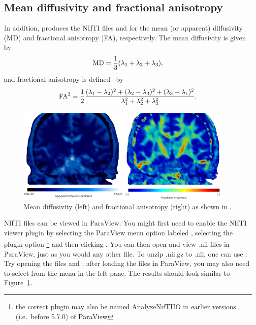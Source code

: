 \subsection{Mean diffusivity and fractional anisotropy}
In addition,  produces the NIfTI files
 and  for the mean (or apparent)
diffusivity (MD) and fractional anisotropy (FA), respectively. 
The mean diffusivity is given by 
\begin{equation}\label{eqn:chp5:md}
  \rm{MD} = \frac{1}{3}(\lambda_1 + \lambda_2 + \lambda_3),   
\end{equation}
and  fractional
anisotropy is defined~\cite{kindlmann2007geodesic} by
\begin{equation}\label{eqn:chp5:fa}
	\rm{FA}^2 = \frac{1}{2} \frac{(\lambda_1-\lambda_2)^2 
+ (\lambda_2 - \lambda_3)^2 + (\lambda_3 - \lambda_1)^2}{\lambda_1^2 
+ \lambda_2^2 + \lambda_3^2} .  
\end{equation}
\begin{figure}	
  \begin{center}
    \includegraphics[width=0.95\textwidth]{./graphics/chp5/paraview_adcfa.png}
  \end{center}
  \caption{Mean diffusivity (left) and fractional anisotropy (right) as shown in .}
  \label{fig:chp5:DTIfa}
\end{figure}
NIfTI files can be viewed in ParaView. You might first need to enable
the NIfTI viewer plugin by selecting the ParaView menu option labeled
, selecting the plugin option%
\footnote{the correct plugin may also be named AnalyzeNifTIIO in earlier 
versions (i.e.~before 5.7.0) of ParaView} 
 and then clicking . You
can then open and view .nii files in ParaView, just as you would any other
file. To unzip .nii.gz to .nii, one can use :
\noindent Try opening the files  and
; after loading the files in ParaView, you may also need to select 
 from the  menu in the left pane. The 
results should look similar to Figure~\ref{fig:chp5:DTIfa}.

